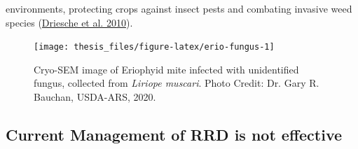 \documentclass[12pt,final,CPage]{ufthesis}
\begin{document}
{environments, protecting crops against insect pests and combating invasive weed species (\protect\hyperlink{ref-Driesche2010}{Driesche et al. 2010}).
  \begin{figure}

  {\centering \texttt{[image: thesis\_files/figure-latex/erio-fungus-1]} 

  }

  \caption{Cryo-SEM image of Eriophyid mite infected with unidentified fungus, collected from \textit{Liriope muscari}. Photo Credit: Dr. Gary R. Bauchan, USDA-ARS, 2020.}\label{fig:erio-fungus}
  \end{figure}
  \hypertarget{litrev-manage}{%
  \subsection{Current Management of RRD is not effective}\label{litrev-manage}}

}
\end{document}
